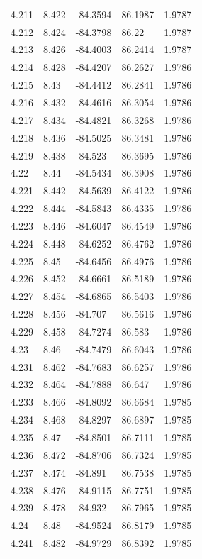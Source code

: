 \begin{tabular}{lllll}
4.211 & 8.422 & -84.3594 & 86.1987 & 1.9787 \\
4.212 & 8.424 & -84.3798 & 86.22 & 1.9787 \\
4.213 & 8.426 & -84.4003 & 86.2414 & 1.9787 \\
4.214 & 8.428 & -84.4207 & 86.2627 & 1.9786 \\
4.215 & 8.43 & -84.4412 & 86.2841 & 1.9786 \\
4.216 & 8.432 & -84.4616 & 86.3054 & 1.9786 \\
4.217 & 8.434 & -84.4821 & 86.3268 & 1.9786 \\
4.218 & 8.436 & -84.5025 & 86.3481 & 1.9786 \\
4.219 & 8.438 & -84.523 & 86.3695 & 1.9786 \\
4.22 & 8.44 & -84.5434 & 86.3908 & 1.9786 \\
4.221 & 8.442 & -84.5639 & 86.4122 & 1.9786 \\
4.222 & 8.444 & -84.5843 & 86.4335 & 1.9786 \\
4.223 & 8.446 & -84.6047 & 86.4549 & 1.9786 \\
4.224 & 8.448 & -84.6252 & 86.4762 & 1.9786 \\
4.225 & 8.45 & -84.6456 & 86.4976 & 1.9786 \\
4.226 & 8.452 & -84.6661 & 86.5189 & 1.9786 \\
4.227 & 8.454 & -84.6865 & 86.5403 & 1.9786 \\
4.228 & 8.456 & -84.707 & 86.5616 & 1.9786 \\
4.229 & 8.458 & -84.7274 & 86.583 & 1.9786 \\
4.23 & 8.46 & -84.7479 & 86.6043 & 1.9786 \\
4.231 & 8.462 & -84.7683 & 86.6257 & 1.9786 \\
4.232 & 8.464 & -84.7888 & 86.647 & 1.9786 \\
4.233 & 8.466 & -84.8092 & 86.6684 & 1.9785 \\
4.234 & 8.468 & -84.8297 & 86.6897 & 1.9785 \\
4.235 & 8.47 & -84.8501 & 86.7111 & 1.9785 \\
4.236 & 8.472 & -84.8706 & 86.7324 & 1.9785 \\
4.237 & 8.474 & -84.891 & 86.7538 & 1.9785 \\
4.238 & 8.476 & -84.9115 & 86.7751 & 1.9785 \\
4.239 & 8.478 & -84.932 & 86.7965 & 1.9785 \\
4.24 & 8.48 & -84.9524 & 86.8179 & 1.9785 \\
4.241 & 8.482 & -84.9729 & 86.8392 & 1.9785 \\

\end{tabular}
